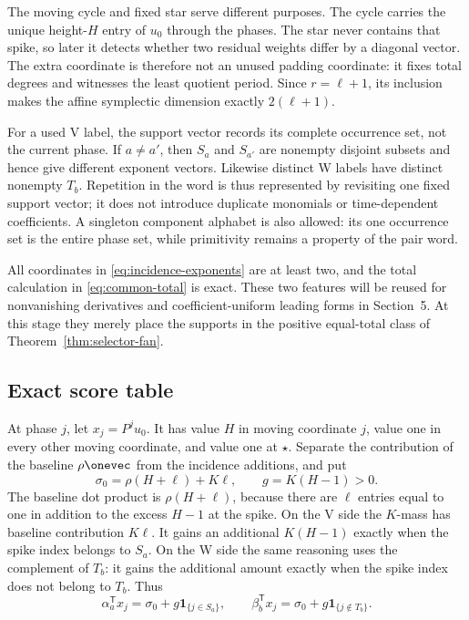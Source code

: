 \documentclass[11pt,letterpaper]{article}
\theoremstyle{definition}
\theoremstyle{remark}
\numberwithin{equation}{section}
\begin{document}
The moving cycle and fixed star serve different purposes.  The cycle carries
the unique height-\(H\) entry of \(u_0\) through the phases.  The star never
contains that spike, so later it detects whether two residual weights differ
by a diagonal vector.  The extra coordinate is therefore not an unused
padding coordinate: it fixes total degrees and witnesses the least quotient
period.  Since \(r=\ell+1\), its inclusion makes the affine symplectic
dimension exactly \(2(\ell+1)\).

For a used V label, the support vector records its complete occurrence set,
not the current phase.  If \(a\neq a'\), then \(S_a\) and \(S_{a'}\) are
nonempty disjoint subsets and hence give different exponent vectors.
Likewise distinct W labels have distinct nonempty \(T_b\).  Repetition in
the word is thus represented by revisiting one fixed support vector; it does
not introduce duplicate monomials or time-dependent coefficients.  A
singleton component alphabet is also allowed: its one occurrence set is the
entire phase set, while primitivity remains a property of the pair word.

All coordinates in \eqref{eq:incidence-exponents} are at least two, and the
total calculation in \eqref{eq:common-total} is exact.  These two features
will be reused for nonvanishing derivatives and coefficient-uniform leading
forms in Section~5.  At this stage they merely place the supports in the
positive equal-total class of Theorem~\ref{thm:selector-fan}.

\subsection{Exact score table}

At phase \(j\), let \(x_j=P^ju_0\).  It has value \(H\) in moving
coordinate \(j\), value one in every other moving coordinate, and value one
at \(\star\).  Separate the contribution of the baseline \(\rho\onevec\)
from the incidence additions, and put
\begin{equation}
 \sigma_0=\rho(H+\ell)+K\ell,
 \qquad
 g=K(H-1)>0.
 \label{eq:score-constants}
\end{equation}
The baseline dot product is \(\rho(H+\ell)\), because there are \(\ell\)
entries equal to one in addition to the excess \(H-1\) at the spike.  On
the V side the \(K\)-mass has baseline contribution \(K\ell\).  It gains an
additional \(K(H-1)\) exactly when the spike index belongs to \(S_a\).  On
the W side the same reasoning uses the complement of \(T_b\): it gains the
additional amount exactly when the spike index does not belong to \(T_b\).
Thus
\begin{equation}
 \alpha_a^{\mathsf T}x_j
   =\sigma_0+g\mathbf1_{\{j\in S_a\}},
 \qquad
 \beta_b^{\mathsf T}x_j
   =\sigma_0+g\mathbf1_{\{j\notin T_b\}}.
 \label{eq:score-table}
\end{equation}
\end{document}
